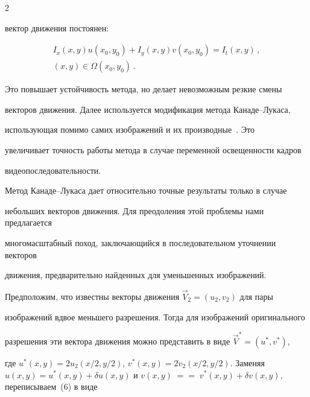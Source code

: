 \begin{multicols}{2}





\noindent


вектор движения постоянен:


\begin{multline}


I_x(x,y) u(x_0,y_0)+I_y(x,y)v(x_0,y_0)=I_t(x,y)\,,\\


(x,y)\in \Omega(x_0,y_0)\,.


\label{e8nas}


\end{multline}





     Это повышает устойчивость метода, но делает невозможным резкие смены


векторов движения. Далее используется модификация метода Канаде--Лукаса,


использующая помимо самих изображений и их производные~\cite{17nas}. Это


увеличивает точность работы метода в случае переменной освещенности кадров


видеопоследовательности.





     Метод Канаде--Лукаса дает относительно точные результаты только в случае


небольших векторов движения. Для преодоления этой проблемы нами предлагается


многомасштабный поход, заключающийся в последовательном уточнении векторов


движения, предварительно найденных для уменьшенных изображений.





     Предположим, что известны векторы движения $\vec{V}_2=(u_2,v_2)$ для пары


изображений вдвое меньшего разрешения. Тогда для изображений оригинального


разрешения эти вектора движения можно представить в виде $\vec{V}^*=(u^*,v^*)$,


где $u^*(x,y)=2u_2(x/2,y/2)$, $v^*(x,y)=2v_2(x/2,y/2)$. Заменяя $u(x,y)=u^*(x,y)+\delta


u(x,y)$ и $v(x,y)\;=$\linebreak $=\;v^*(x,y)+\delta v(x,y)$, переписываем~(6) в виде



\end{multicols}
